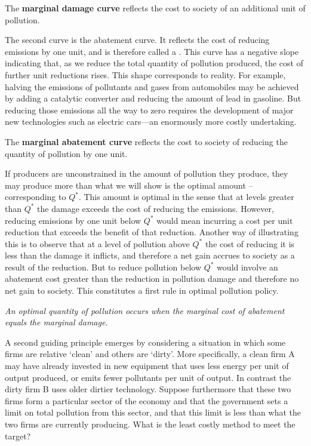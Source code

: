

\begin{DefBox}
The \textbf{marginal damage curve} reflects the cost to society of an additional unit of pollution.
\end{DefBox}

The second curve is the abatement curve. It reflects the cost of reducing emissions by one unit, and is therefore called a . This curve has a negative slope indicating that, as we reduce the total quantity of pollution produced, the cost of further unit reductions rises. This shape corresponds to reality. For example, halving the emissions of pollutants and gases from automobiles may be achieved by adding a catalytic converter and reducing the amount of lead in gasoline. But reducing those emissions all the way to zero requires the development of major new technologies such as electric cars---an enormously more costly undertaking.

\begin{DefBox}
The \textbf{marginal abatement curve} reflects the cost to society of reducing the quantity of pollution by one unit.
\end{DefBox}

If producers are unconstrained in the amount of pollution they produce, they may produce more than what we will show is the optimal amount -- corresponding to $Q^*$. This amount is optimal in the sense that at levels greater than $Q^*$ the damage exceeds the cost of reducing the emissions. However, reducing emissions by one unit below $Q^*$ would mean incurring a cost per unit reduction that exceeds the benefit of that reduction. Another way of illustrating this is to observe that at a level of pollution above $Q^*$ the cost of reducing it is less than the damage it inflicts, and therefore a net gain accrues to society as a result of the reduction. But to reduce pollution below $Q^*$ would involve an abatement cost greater than the reduction in pollution damage and therefore no net gain to society. This constitutes a first rule in optimal pollution policy.

\textit{An optimal quantity of pollution occurs when the marginal cost of abatement equals the marginal damage.}

A second guiding principle emerges by considering a situation in which some firms are relative `clean' and others are `dirty'. More specifically, a clean firm A may have already invested in new equipment that uses less energy per unit of output produced, or emits fewer pollutants per unit of output. In contrast the dirty firm B uses older dirtier technology. Suppose furthermore that these two firms form a particular sector of the economy and that the government sets a limit on total pollution from this sector, and that this limit is less than what the two firms are currently producing. What is the least costly method to meet the target?


